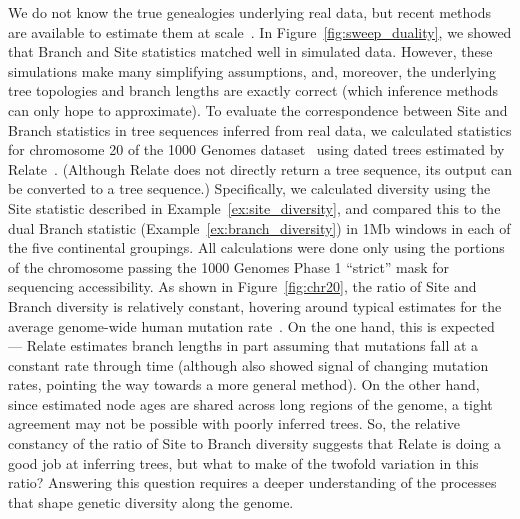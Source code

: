 \documentclass{article}
\begin{document}
We do not know the true genealogies underlying real data,
but recent methods are available to estimate them at
scale~\citep{kelleher2019inferring,speidel2019method}.
In Figure~\ref{fig:sweep_duality}, we showed that Branch and Site statistics
matched well in simulated data. However, these simulations make many
simplifying assumptions, and, moreover,
the underlying tree topologies and branch lengths are exactly
correct (which inference methods can only hope to approximate).
To evaluate the correspondence between Site and Branch statistics
in tree sequences inferred from real data,
we calculated statistics for chromosome 20
of the 1000 Genomes dataset~\citep{1k2015global} using dated trees estimated
by Relate~\citep{speidel2019method}. 
(Although Relate does not directly return a tree sequence, its output can be converted to a tree sequence.)
Specifically, we calculated diversity using the Site statistic
described in Example~\ref{ex:site_diversity},
and compared this to the dual Branch statistic (Example~\ref{ex:branch_diversity})
in 1Mb windows in each of the five continental groupings.
All calculations were done only using the portions of the chromosome
passing the 1000 Genomes Phase 1 ``strict'' mask for sequencing accessibility.
As shown in Figure~\ref{fig:chr20}, the ratio of Site and Branch diversity
is relatively constant, hovering around typical estimates for the average genome-wide human mutation rate~\citep{narasimhan2017estimating}.
On the one hand, this is expected ---
Relate estimates branch lengths in part assuming that mutations fall at a constant rate through time
(although \citeauthor{speidel2019method} also showed signal of changing mutation rates,
pointing the way towards a more general method).
On the other hand,
since estimated node ages are shared across long regions of the genome,
a tight agreement may not be possible with poorly inferred trees.
So, the relative constancy of the ratio of Site to Branch diversity
suggests that Relate is doing a good job at inferring trees,
but what to make of the twofold variation in this ratio?
Answering this question requires a deeper understanding of the processes that shape
genetic diversity along the genome.
\end{document}
